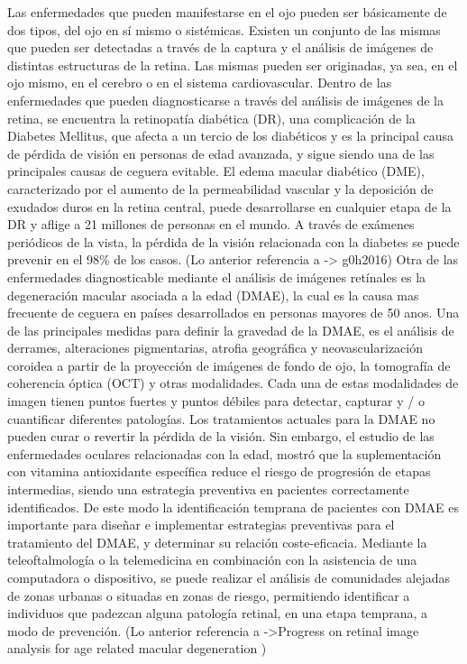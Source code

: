 Las enfermedades que pueden manifestarse en el ojo pueden ser b\'asicamente de dos tipos, del ojo en s\'i mismo o sist\'emicas. Existen un conjunto de las mismas que pueden ser detectadas a trav\'es de la captura y el an\'alisis de im\'agenes de distintas estructuras de la retina. Las mismas pueden ser originadas, ya sea, en el ojo mismo, en el cerebro o en el sistema cardiovascular.
Dentro de las enfermedades que pueden diagnosticarse a trav\'es del an\'alisis de im\'agenes de la retina, se encuentra la retinopat\'ia diab\'etica (DR), una complicaci\'on de la Diabetes Mellitus, que afecta a un tercio de los diab\'eticos  y es la principal causa de p\'erdida de visi\'on en personas de edad avanzada,  y sigue siendo una de las principales causas de ceguera evitable. El edema macular diab\'etico (DME), caracterizado por el aumento de la permeabilidad vascular y la deposici\'on de exudados duros en la retina central, puede desarrollarse en cualquier etapa de la DR y aflige a 21 millones de personas en el mundo.  A trav\'es de ex\'amenes peri\'odicos de la vista, la p\'erdida de la visi\'on relacionada con la diabetes se puede prevenir en el 98\% de los casos.
(Lo anterior referencia a -> g0h2016)
Otra de las enfermedades diagnosticable mediante el an\'alisis de im\'agenes ret\'inales es la degeneraci\'on macular asociada a la edad (DMAE), la cual es la causa mas frecuente de ceguera en pa\'ises desarrollados en personas mayores de 50 anos. Una de las principales medidas para definir la gravedad de la DMAE, es el an\'alisis de derrames, alteraciones pigmentarias, atrofia geogr\'afica  y neovascularizaci\'on coroidea a partir de la proyecci\'on de im\'agenes de fondo de ojo, la tomograf\'ia de coherencia \'optica (OCT) y otras modalidades. Cada una de estas modalidades de imagen tienen puntos fuertes y puntos d\'ebiles para detectar, capturar y / o cuantificar diferentes patolog\'ias. Los tratamientos actuales para la DMAE no pueden curar o revertir la p\'erdida de la visi\'on. Sin embargo, el estudio de las enfermedades oculares relacionadas con la edad, mostr\'o que la suplementaci\'on con vitamina antioxidante espec\'ifica reduce el riesgo de progresi\'on de etapas intermedias, siendo una estrategia preventiva en pacientes correctamente identificados. De este modo la identificaci\'on temprana de pacientes con DMAE es importante para diseñar e implementar estrategias preventivas para el tratamiento del DMAE, y determinar su relaci\'on coste-eficacia. Mediante la teleoftalmolog\'ia o la telemedicina en combinaci\'on con la asistencia de una computadora o dispositivo, se puede realizar el an\'alisis de comunidades alejadas de zonas urbanas o situadas en zonas de riesgo, permitiendo identificar a individuos que padezcan alguna patolog\'ia retinal, en una etapa temprana, a modo de prevenci\'on.
(Lo anterior referencia a ->Progress on retinal image analysis for age related macular degeneration )

